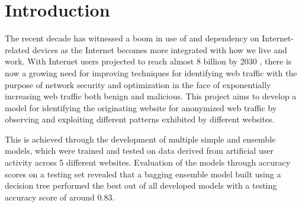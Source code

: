 \documentclass[10pt,sigconf,letterpaper,nonacm]{acmart}
\begin{document}
\title{\PaperTitle}

\author{Charles Hu}

\begin{abstract}
  In this project, we address the task of identifying the originating website given some anonymized web traffic for the purposes of gaining new insights for improving network security and optimization.
  We construct a data set of TCP streams sourced from 5 different websites: github.com, google.com, reuters.com, wikipedia.org, and youtube.com.
  With this, we develop and test 15 different machine learning models based on simple and ensemble model designs.
  We determine that a bagging ensemble model built using a decision tree provides the best performance with an accuracy score of 0.83 on the testing set, demonstrate the capabilities of ensemble models, and note the implication that web traffic data may be distinctive and generally non-overlapping.
  Challenges to this project are then analyzed and addressed with potential future avenues for improvement.
\end{abstract}


\maketitle

\section{Introduction}

The recent decade has witnessed a boom in use of and dependency on Internet-related devices as the Internet becomes more integrated with how we live and work.
With Internet users projected to reach almost 8 billion by 2030 \cite{forbes}, there is now a growing need for improving techniques for identifying web traffic with the purpose of network security and optimization \cite{traffic} in the face of exponentially increasing web traffic both benign and malicious.
This project aims to develop a model for identifying the originating website for anonymized web traffic by observing and exploiting different patterns exhibited by different websites.

This is achieved through the development of multiple simple and ensemble models, which were trained and tested on data derived from artificial user activity across 5 different websites.
Evaluation of the models through accuracy scores on a testing set revealed that a bagging ensemble model built using a decision tree performed the best out of all developed models with a testing accuracy score of around 0.83.
\end{document}
